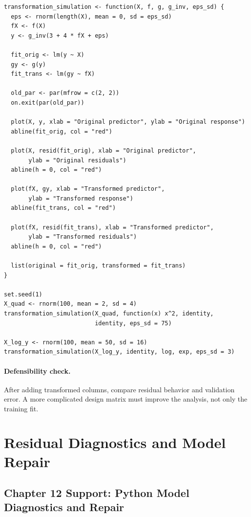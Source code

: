 \begin{verbatim}
transformation_simulation <- function(X, f, g, g_inv, eps_sd) {
  eps <- rnorm(length(X), mean = 0, sd = eps_sd)
  fX <- f(X)
  y <- g_inv(3 + 4 * fX + eps)

  fit_orig <- lm(y ~ X)
  gy <- g(y)
  fit_trans <- lm(gy ~ fX)

  old_par <- par(mfrow = c(2, 2))
  on.exit(par(old_par))

  plot(X, y, xlab = "Original predictor", ylab = "Original response")
  abline(fit_orig, col = "red")

  plot(X, resid(fit_orig), xlab = "Original predictor",
       ylab = "Original residuals")
  abline(h = 0, col = "red")

  plot(fX, gy, xlab = "Transformed predictor",
       ylab = "Transformed response")
  abline(fit_trans, col = "red")

  plot(fX, resid(fit_trans), xlab = "Transformed predictor",
       ylab = "Transformed residuals")
  abline(h = 0, col = "red")

  list(original = fit_orig, transformed = fit_trans)
}

set.seed(1)
X_quad <- rnorm(100, mean = 2, sd = 4)
transformation_simulation(X_quad, function(x) x^2, identity,
                          identity, eps_sd = 75)

X_log_y <- rnorm(100, mean = 50, sd = 16)
transformation_simulation(X_log_y, identity, log, exp, eps_sd = 3)
\end{verbatim}

\paragraph{Defensibility check.} After adding transformed columns, compare residual behavior and validation error.  A more complicated design matrix must improve the analysis, not only the training fit.

\section{Residual Diagnostics and Model Repair}
\label{app:cookbook-residual-diagnostics-repair}

\subsection{Chapter 12 Support: Python Model Diagnostics and Repair}
\label{app:ch12-software-cookbook-python}

